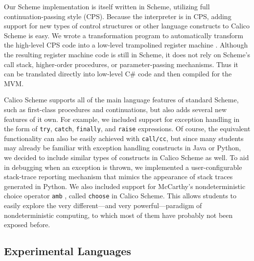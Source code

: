\documentclass[preprint]{sigplanconf}
\begin{document}
Our Scheme implementation is itself written in Scheme, utilizing full
continuation-passing style (CPS).  Because the interpreter is in CPS, adding
support for new types of control structures or other language constructs to
Calico Scheme is easy.  We wrote a transformation program to automatically
transform the high-level CPS code into a low-level trampolined register machine
\cite{EOPL3}.  Although the resulting register machine code is still in Scheme,
it does not rely on Scheme's call stack, higher-order procedures, or
parameter-passing mechanisms.  Thus it can be translated directly into
low-level C# code and then compiled for the MVM.

Calico Scheme supports all of the main language features of standard Scheme,
such as first-class procedures and continuations, but also adds several new
features of it own.  For example, we included support for exception handling in
the form of \texttt{try}, \texttt{catch}, \texttt{finally}, and \texttt{raise}
expressions.  Of course, the equivalent functionality can also be easily
achieved with \texttt{call/cc}, but since many students may already be familiar
with exception handling constructs in Java or Python, we decided to include
similar types of constructs in Calico Scheme as well.  To aid in debugging when
an exception is thrown, we implemented a user-configurable stack-trace
reporting mechanism that mimics the appearance of stack traces generated in
Python.  We also included support for McCarthy's nondeterministic choice
operator \texttt{amb} \cite{AMB}, called \texttt{choose} in Calico Scheme.
This allows students to easily explore the very different---and very
powerful---paradigm of nondeterministic computing, to which most of them have
probably not been exposed before.






\subsection{Experimental Languages}
\end{document}

